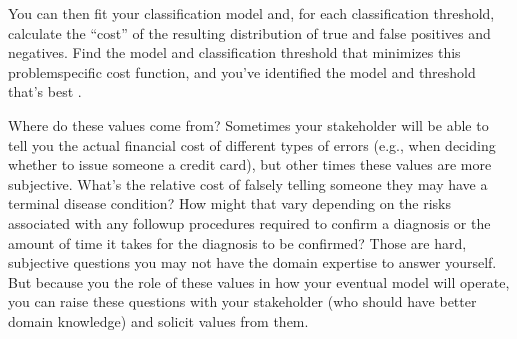 \documentclass[letterpaper,10pt,english]{jupyterBook}
\begin{document}
\sphinxAtStartPar
You can then fit your classification model and, for each classification threshold, calculate the “cost” of the resulting distribution of true and false positives and negatives. Find the model and classification threshold that minimizes this problem\sphinxhyphen{}specific cost function, and you’ve identified the model and threshold that’s best .

\sphinxAtStartPar
Where do these values come from? Sometimes your stakeholder will be able to tell you the actual financial cost of different types of errors (e.g., when deciding whether to issue someone a credit card), but other times these values are more subjective. What’s the relative cost of falsely telling someone they may have a terminal disease condition? How might that vary depending on the risks associated with any followup procedures required to confirm a diagnosis or the amount of time it takes for the diagnosis to be confirmed? Those are hard, subjective questions you may not have the domain expertise to answer yourself. But because you  the role of these values in how your eventual model will operate, you can raise these questions with your stakeholder (who should have better domain knowledge) and solicit values from them.
\end{document}
